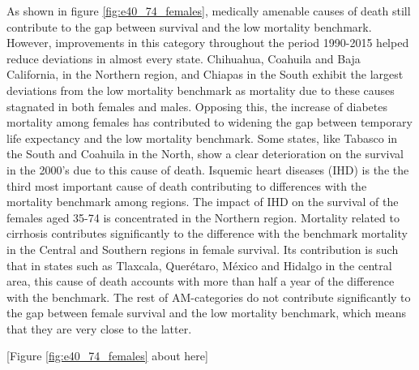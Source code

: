 \documentclass[11.5pt]{article}
\begin{document}
\begin{spacing}{1.5}
As shown in figure \ref{fig:e40_74_females}, medically amenable causes of death still contribute to the gap between survival and the low mortality benchmark. However, improvements in this category throughout the period 1990-2015 helped reduce deviations in almost every state. Chihuahua, Coahuila and Baja California, in the Northern region, and Chiapas in the South exhibit the largest deviations from the low mortality benchmark as mortality due to these causes stagnated in both females and males. Opposing this, the increase of diabetes mortality among females has contributed to widening the gap between temporary life expectancy and the low mortality benchmark. Some states, like Tabasco in the South and Coahuila in the North, show a clear deterioration on the survival in the 2000's due to this cause of death. Isquemic heart diseases (IHD) is the the third most important cause of death contributing to differences with the mortality benchmark among regions. The impact of IHD on the survival of the females aged 35-74 is concentrated in the Northern region. Mortality related to cirrhosis contributes significantly to the difference with the benchmark mortality in the Central and Southern regions in female survival. Its contribution is such that in states such as Tlaxcala, Quer\'etaro, M\'exico and Hidalgo in the central area, this cause of death accounts with more than half a year of the difference with the benchmark. The rest of AM-categories do not contribute significantly to the gap between female survival and the low mortality benchmark, which means that they are very close to the latter.\\

\begin{center}
[Figure \ref{fig:e40_74_females} about here]
\end{center}



\end{spacing}
\end{document}
